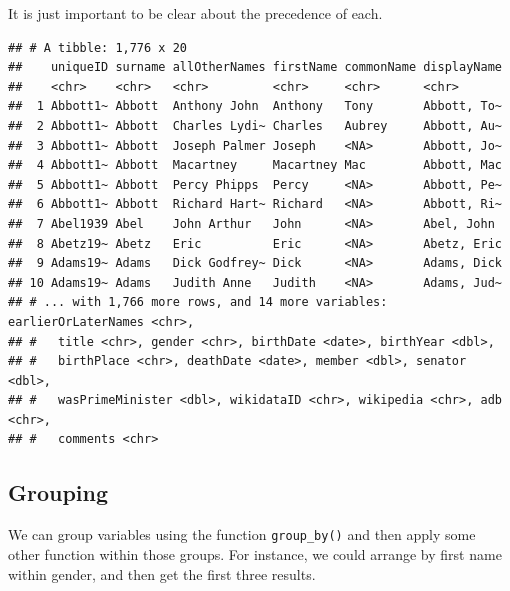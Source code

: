\documentclass[
]{book}
\newenvironment{Shaded}{\begin{snugshade}}{\end{snugshade}}
\newcommand{\DecValTok}[1]{\textcolor[rgb]{0.00,0.00,0.81}{#1}}
\newcommand{\KeywordTok}[1]{\textcolor[rgb]{0.13,0.29,0.53}{\textbf{#1}}}
\newcommand{\NormalTok}[1]{#1}
\newcommand{\OperatorTok}[1]{\textcolor[rgb]{0.81,0.36,0.00}{\textbf{#1}}}
\newcommand{\StringTok}[1]{\textcolor[rgb]{0.31,0.60,0.02}{#1}}
\begin{document}
It is just important to be clear about the precedence of each.

\begin{Shaded}
\end{Shaded}

\begin{verbatim}
## # A tibble: 1,776 x 20
##    uniqueID surname allOtherNames firstName commonName displayName
##    <chr>    <chr>   <chr>         <chr>     <chr>      <chr>      
##  1 Abbott1~ Abbott  Anthony John  Anthony   Tony       Abbott, To~
##  2 Abbott1~ Abbott  Charles Lydi~ Charles   Aubrey     Abbott, Au~
##  3 Abbott1~ Abbott  Joseph Palmer Joseph    <NA>       Abbott, Jo~
##  4 Abbott1~ Abbott  Macartney     Macartney Mac        Abbott, Mac
##  5 Abbott1~ Abbott  Percy Phipps  Percy     <NA>       Abbott, Pe~
##  6 Abbott1~ Abbott  Richard Hart~ Richard   <NA>       Abbott, Ri~
##  7 Abel1939 Abel    John Arthur   John      <NA>       Abel, John 
##  8 Abetz19~ Abetz   Eric          Eric      <NA>       Abetz, Eric
##  9 Adams19~ Adams   Dick Godfrey~ Dick      <NA>       Adams, Dick
## 10 Adams19~ Adams   Judith Anne   Judith    <NA>       Adams, Jud~
## # ... with 1,766 more rows, and 14 more variables: earlierOrLaterNames <chr>,
## #   title <chr>, gender <chr>, birthDate <date>, birthYear <dbl>,
## #   birthPlace <chr>, deathDate <date>, member <dbl>, senator <dbl>,
## #   wasPrimeMinister <dbl>, wikidataID <chr>, wikipedia <chr>, adb <chr>,
## #   comments <chr>
\end{verbatim}

\hypertarget{grouping}{%
\subsection{Grouping}\label{grouping}}

We can group variables using the function \texttt{group\_by()} and then apply some other function within those groups. For instance, we could arrange by first name within gender, and then get the first three results.

\begin{Shaded}
\end{Shaded}
\end{document}
